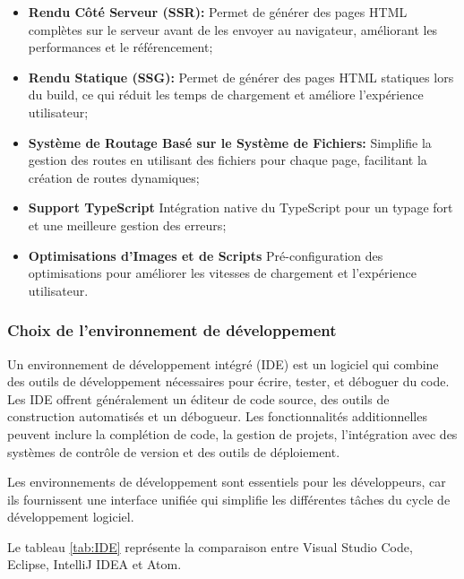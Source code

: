 \documentclass[12pt]{report}
\begin{document}
				 \begin{itemize}
					\item \textbf{Rendu Côté Serveur (SSR):} Permet de générer des pages HTML complètes sur le serveur avant de les envoyer au navigateur, améliorant les performances et le référencement;
					\item \textbf{Rendu Statique (SSG):} Permet de générer des pages HTML statiques lors du build, ce qui réduit les temps de chargement et améliore l'expérience utilisateur;
					\item \textbf{Système de Routage Basé sur le Système de Fichiers:} Simplifie la gestion des routes en utilisant des fichiers pour chaque page, facilitant la création de routes dynamiques;
					\item \textbf{Support TypeScript} Intégration native du TypeScript pour un typage fort et une meilleure gestion des erreurs;
					\item \textbf{Optimisations d'Images et de Scripts} Pré-configuration des optimisations pour améliorer les vitesses de chargement et l'expérience utilisateur.
				\end{itemize}


				\subsubsection{Choix de l’environnement de développement}
				
				\hspace{15pt} Un environnement de développement intégré (IDE) est un logiciel qui combine des outils de développement nécessaires pour écrire, tester, et déboguer du code. Les IDE offrent généralement un éditeur de code source, des outils de construction automatisés et un débogueur. Les fonctionnalités additionnelles peuvent inclure la complétion de code, la gestion de projets, l’intégration avec des systèmes de contrôle de version et des outils de déploiement.

				Les environnements de développement sont essentiels pour les développeurs, car ils fournissent une interface unifiée qui simplifie les différentes tâches du cycle de développement logiciel.

				Le tableau \ref{tab:IDE} représente la comparaison entre Visual Studio Code, Eclipse, IntelliJ IDEA et Atom.
				
\end{document}
